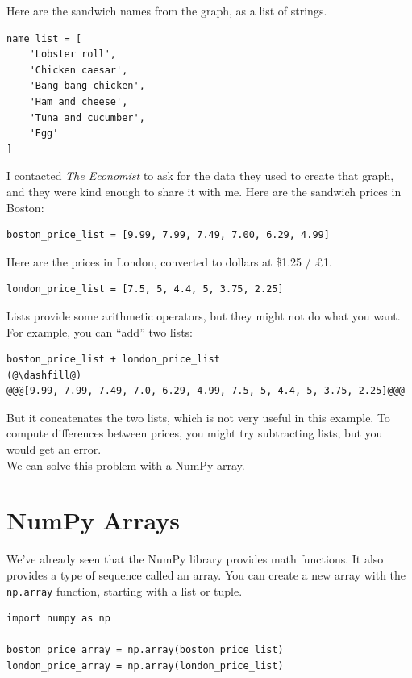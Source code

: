 Here are the sandwich names from the graph, as a list of strings.

\begin{lstlisting}[]
name_list = [
    'Lobster roll',
    'Chicken caesar',
    'Bang bang chicken',
    'Ham and cheese',
    'Tuna and cucumber',
    'Egg'
]
\end{lstlisting}

I contacted \emph{The Economist} to ask for the data they used to create
that graph, and they were kind enough to share it with me. Here are the
sandwich prices in Boston:

\begin{lstlisting}[]
boston_price_list = [9.99, 7.99, 7.49, 7.00, 6.29, 4.99]
\end{lstlisting}

Here are the prices in London, converted to dollars at \$1.25 / £1.

\begin{lstlisting}[]
london_price_list = [7.5, 5, 4.4, 5, 3.75, 2.25]
\end{lstlisting}

Lists provide some arithmetic operators, but they might not do what you
want. For example, you can ``add'' two lists:

\begin{lstlisting}[]
boston_price_list + london_price_list
(@\dashfill@)
@@@[9.99, 7.99, 7.49, 7.0, 6.29, 4.99, 7.5, 5, 4.4, 5, 3.75, 2.25]@@@
\end{lstlisting}

But it concatenates the two lists, which is not very useful in this
example. To compute differences between prices, you might try
subtracting lists, but you would get an error.\\
We can solve this problem with a NumPy array.

\hypertarget{numpy-arrays}{%
\section{NumPy Arrays}\label{numpy-arrays}}

We've already seen that the NumPy library provides math functions. It
also provides a type of sequence called an array. You can create a new
array with the \passthrough{\lstinline!np.array!} function, starting
with a list or tuple.

\begin{lstlisting}[]
import numpy as np

boston_price_array = np.array(boston_price_list)
london_price_array = np.array(london_price_list)
\end{lstlisting}

